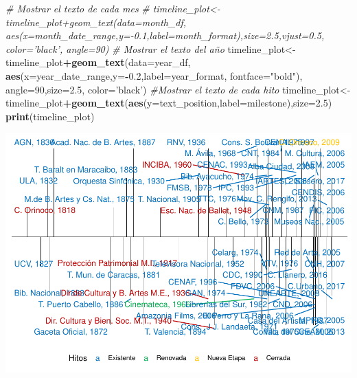 \documentclass[]{article}
\newenvironment{Shaded}{\begin{snugshade}}{\end{snugshade}}
\newcommand{\CommentTok}[1]{\textcolor[rgb]{0.56,0.35,0.01}{\textit{#1}}}
\newcommand{\DataTypeTok}[1]{\textcolor[rgb]{0.13,0.29,0.53}{#1}}
\newcommand{\DecValTok}[1]{\textcolor[rgb]{0.00,0.00,0.81}{#1}}
\newcommand{\FloatTok}[1]{\textcolor[rgb]{0.00,0.00,0.81}{#1}}
\newcommand{\KeywordTok}[1]{\textcolor[rgb]{0.13,0.29,0.53}{\textbf{#1}}}
\newcommand{\NormalTok}[1]{#1}
\newcommand{\OperatorTok}[1]{\textcolor[rgb]{0.81,0.36,0.00}{\textbf{#1}}}
\newcommand{\StringTok}[1]{\textcolor[rgb]{0.31,0.60,0.02}{#1}}
\begin{document}
\begin{Shaded}
\begin{Highlighting}[]
\CommentTok{# Mostrar el texto de cada mes}
\CommentTok{# timeline_plot<-timeline_plot+geom_text(data=month_df, aes(x=month_date_range,y=-0.1,label=month_format),size=2.5,vjust=0.5, color='black', angle=90)}
\CommentTok{# Mostrar el texto del año}
\NormalTok{ timeline_plot<-timeline_plot}\OperatorTok{+}\KeywordTok{geom_text}\NormalTok{(}\DataTypeTok{data=}\NormalTok{year_df, }\KeywordTok{aes}\NormalTok{(}\DataTypeTok{x=}\NormalTok{year_date_range,}\DataTypeTok{y=}\OperatorTok{-}\FloatTok{0.2}\NormalTok{,}\DataTypeTok{label=}\NormalTok{year_format, }\DataTypeTok{fontface=}\StringTok{"bold"}\NormalTok{), }\DataTypeTok{angle=}\DecValTok{90}\NormalTok{,}\DataTypeTok{size=}\FloatTok{2.5}\NormalTok{, }\DataTypeTok{color=}\StringTok{'black'}\NormalTok{)}
\CommentTok{#Mostrar el texto de cada hito}
\NormalTok{timeline_plot<-timeline_plot}\OperatorTok{+}\KeywordTok{geom_text}\NormalTok{(}\KeywordTok{aes}\NormalTok{(}\DataTypeTok{y=}\NormalTok{text_position,}\DataTypeTok{label=}\NormalTok{milestone),}\DataTypeTok{size=}\FloatTok{2.5}\NormalTok{)}
\KeywordTok{print}\NormalTok{(timeline_plot)}
\end{Highlighting}
\end{Shaded}

\includegraphics{LineaTiempoCultural_files/figure-latex/lineaTiempo-1.pdf}
\end{document}
